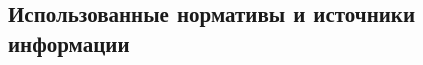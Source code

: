 
\subsection{Использованные нормативы и источники информации}
%
\begin{enumerate}
%	
%
%
%
%
%
%
%
%
%

\end{enumerate}
